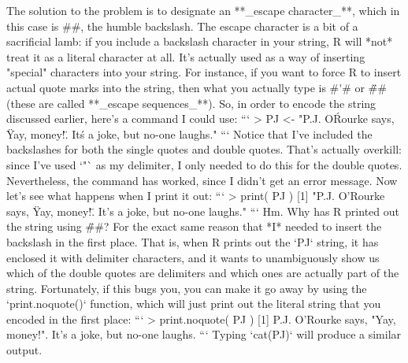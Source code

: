 The solution to the problem is to designate an **_escape character_**, which in this case is \rtextverb#\#, the humble backslash. The escape character is a bit of a sacrificial lamb: if you include a backslash character in your string, R will *not* treat it as a literal character at all. It's actually used as a way of inserting "special" characters into your string. For instance, if you want to force R to insert actual quote marks into the string, then what you actually type is \rtextverb#\'# or \rtextverb#\"# (these are called **_escape sequences_**). So, in order to encode the string discussed earlier, here's a command I could use:
```
> PJ <- "P.J. O\'Rourke says, \"Yay, money!\". It\'s a joke, but no-one laughs."
``` 
Notice that I've included the backslashes for both the single quotes and double quotes. That's actually overkill: since I've used `"` as my delimiter, I only needed to do this for the double quotes. Nevertheless, the command has worked, since I didn't get an error message. Now let's see what happens when I print it out:
```
> print( PJ )
[1] "P.J. O'Rourke says, \"Yay, money!\". It's a joke, but no-one laughs."
```
Hm. Why has R printed out the string using \rtextverb#\"#? For the exact same reason that *I* needed to insert the backslash in the first place. That is, when R prints out the `PJ` string, it has enclosed it with delimiter characters, and it wants to unambiguously show us which of the double quotes are delimiters and which ones are actually part of the string. Fortunately, if this bugs you, you can make it go away by using the `print.noquote()` function, which will just print out the literal string that you encoded in the first place:
```
> print.noquote( PJ )
[1] P.J. O'Rourke says, "Yay, money!". It's a joke, but no-one laughs.
```
Typing `cat(PJ)` will produce a similar output.

